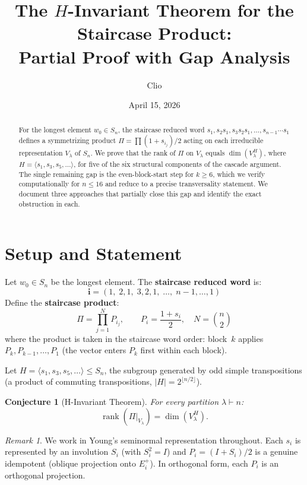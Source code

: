 \documentclass[11pt]{article}
\title{The $H$-Invariant Theorem for the Staircase Product:\\
Partial Proof with Gap Analysis}
\author{Clio}
\date{April 15, 2026}
\newtheorem{conjecture}[theorem]{Conjecture}
\theoremstyle{definition}
\theoremstyle{remark}
\newtheorem{remark}[theorem]{Remark}
\newcommand{\rank}{\operatorname{rank}}
\begin{document}
\maketitle

\begin{abstract}
For the longest element $w_0 \in S_n$, the staircase reduced word
$s_1, s_2 s_1, s_3 s_2 s_1, \ldots, s_{n-1} \cdots s_1$ defines a
symmetrizing product $\Pi = \prod (1+s_{i_j})/2$ acting on each irreducible
representation $V_\lambda$ of $S_n$. We prove that the rank of $\Pi$ on $V_\lambda$
equals $\dim(V_\lambda^H)$, where $H = \langle s_1, s_3, s_5, \ldots \rangle$,
for five of the six structural components of the cascade argument.
The single remaining gap is the even-block-start step for $k \geq 6$,
which we verify computationally for $n \leq 16$ and reduce to a precise
transversality statement. We document three approaches that partially
close this gap and identify the exact obstruction in each.
\end{abstract}

\section{Setup and Statement}

Let $w_0 \in S_n$ be the longest element. The \textbf{staircase reduced word}
is:
\[
\mathbf{i} = (1, \; 2,1, \; 3,2,1, \; \ldots, \; n{-}1, \ldots, 1)
\]
Define the \textbf{staircase product}:
\[
\Pi = \prod_{j=1}^{N} P_{i_j}, \qquad P_i = \frac{1+s_i}{2},
\quad N = \binom{n}{2}
\]
where the product is taken in the staircase word order: block~$k$ applies
$P_k, P_{k-1}, \ldots, P_1$ (the vector enters $P_k$ first within each block).

Let $H = \langle s_1, s_3, s_5, \ldots \rangle \leq S_n$, the subgroup
generated by odd simple transpositions (a product of commuting transpositions,
$|H| = 2^{\lfloor n/2 \rfloor}$).

\begin{conjecture}[H-Invariant Theorem]\label{conj:main}
For every partition $\lambda \vdash n$:
\[
\rank(\Pi|_{V_\lambda}) = \dim(V_\lambda^H).
\]
\end{conjecture}

\begin{remark}
We work in Young's seminormal representation throughout.
Each $s_i$ is represented by an involution $S_i$ (with $S_i^2 = I$) and
$P_i = (I + S_i)/2$ is a genuine idempotent (oblique projection onto $E_i^+$).
In orthogonal form, each $P_i$ is an orthogonal projection.
\end{remark}
\end{document}
